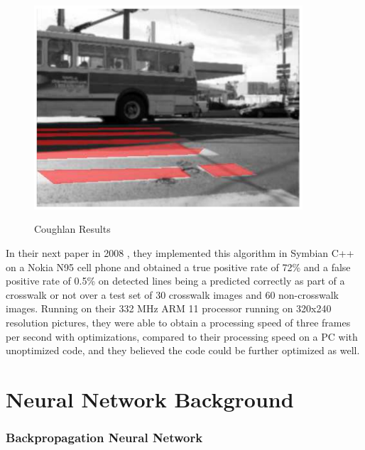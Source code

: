\documentclass[12pt]{ucthesis}
\newcommand{\captionfonts}{\small\bf\ssp}
\begin{document}
\begin{figure}[h!]
\begin{center}
\includegraphics[width=10cm]{CoughlanResult.png}
\captionfonts
\caption[Coughlan Results]{Coughlan Results \cite{Coughlan2006}}
\label{fig:CoughlanResults}
\end{center}
\end{figure}

In their next paper in 2008 \cite{ZebraPhone}, they implemented this algorithm in Symbian C++ on a Nokia  N95 cell phone and obtained a true positive rate of 72\% and a false positive rate of 0.5\% on detected lines being a predicted correctly as part of a crosswalk or not over a test set of 30 crosswalk images and 60 non-crosswalk images. Running on their 332 MHz ARM 11 processor running on 320x240 resolution pictures, they were able to obtain a processing speed of three frames per second with optimizations, compared to their processing speed on a PC with unoptimized code, and they believed the code could be further optimized as well. 

\chapter{Neural Network Background}

\subsection{Backpropagation Neural Network}
\end{document}
